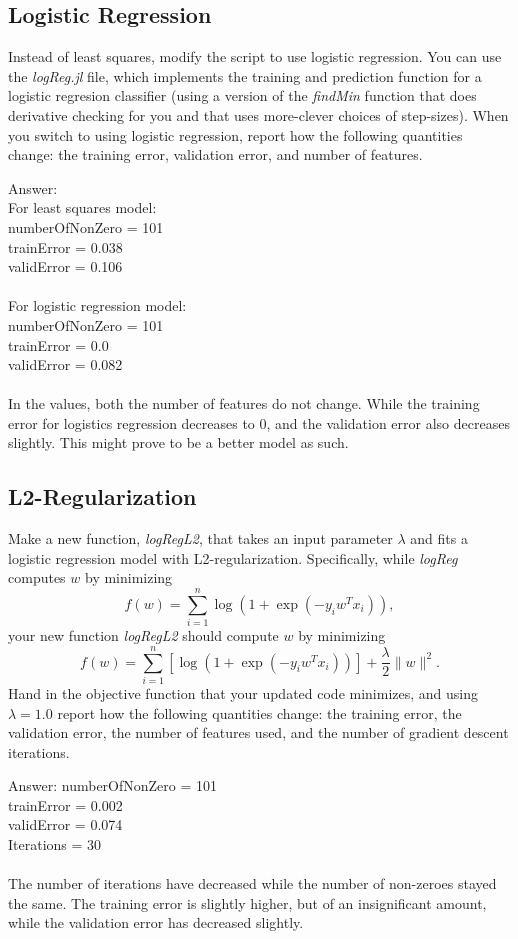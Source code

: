 \documentclass{article}
\def\ans#1{\par\gre{Answer: #1}}
\def\blu#1{{\color{blu}#1}}
\def\gre#1{{\color{gre}#1}}
\def\norm#1{\|#1\|}
\begin{document}
\subsection{Logistic Regression}

Instead of least squares, modify the script to use logistic regression. You can use the \emph{logReg.jl} file, which implements the training and prediction function for a logistic regresion classifier (using a  version of the \emph{findMin} function that does derivative checking for you and that uses more-clever choices of step-sizes). When you switch to using logistic regression, \blu{report how the following quantities change: the training error, validation error, and number of features}.
\ans{\\
For least squares model: \\
numberOfNonZero = 101 \\ 
trainError = 0.038 \\ 
validError = 0.106 \\
\\
For logistic regression model: \\
numberOfNonZero = 101 \\
trainError = 0.0 \\ 
validError = 0.082 \\
\\
In the values, both the number of features do not change. While the training error for logistics regression decreases to 0, and the validation error also decreases slightly. This might prove to be a better model as such.
}


\subsection{L2-Regularization}

Make a new function, \emph{logRegL2}, that takes an input parameter $\lambda$ and fits a logistic regression model with L2-regularization. Specifically, while \emph{logReg} computes $w$ by minimizing
\[
f(w) = \sum_{i=1}^n \log(1+\exp(-y_iw^Tx_i)),
\]
your new function \emph{logRegL2} should compute $w$ by minimizing
\[
f(w) = \sum_{i=1}^n \left[\log(1+\exp(-y_iw^Tx_i))\right] + \frac{\lambda}{2}\norm{w}^2.
\]
\blu{Hand in the objective function that your updated code minimizes, and using $\lambda=1.0$ report how the following quantities change: the training error, the validation error, the number of features used, and the number of gradient descent iterations.}

\ans{numberOfNonZero = 101 \\
trainError = 0.002 \\ 
validError = 0.074 \\
Iterations = 30 \\
\\
The number of iterations have decreased while the number of non-zeroes stayed the same. The training error is slightly higher, but of an insignificant amount, while the validation error has decreased slightly.
}
\end{document}
